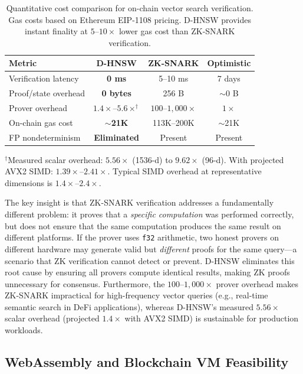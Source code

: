 \documentclass[10pt,journal]{IEEEtran}
\newcommand{\dhnsw}{\textsc{D-HNSW}}
\begin{document}
\begin{table}[t]
  \centering
  \caption{Quantitative cost comparison for on-chain vector search verification. Gas costs based on Ethereum EIP-1108 pricing. D-HNSW provides instant finality at $5$--$10\times$ lower gas cost than ZK-SNARK verification.}
  \label{tab:quant_comparison}
  \footnotesize
  \begin{tabular}{lccc}
    \toprule
    \textbf{Metric} & \textbf{\dhnsw{}} & \textbf{ZK-SNARK} & \textbf{Optimistic} \\
    \midrule
    Verification latency & \textbf{0 ms} & 5--10 ms & 7 days \\
    Proof/state overhead & \textbf{0 bytes} & 256 B & $\sim$0 B \\
    Prover overhead & $1.4\times$--$5.6\times^{\dagger}$ & $100$--$1{,}000\times$ & $1\times$ \\
    On-chain gas cost & \textbf{$\sim$21K} & 113K--200K & $\sim$21K \\
    FP nondeterminism & \textbf{Eliminated} & Present & Present \\
    \bottomrule
  \end{tabular}
  \vspace{1mm}
  {\footnotesize $^{\dagger}$Measured scalar overhead: $5.56\times$ (1536-d) to $9.62\times$ (96-d). With projected AVX2 SIMD: $1.39\times$--$2.41\times$. Typical SIMD overhead at representative dimensions is $1.4\times$--$2.4\times$.}
\end{table}

The key insight is that ZK-SNARK verification addresses a fundamentally different problem: it proves that a \emph{specific computation} was performed correctly, but does not ensure that the same computation produces the same result on different platforms. If the prover uses \texttt{f32} arithmetic, two honest provers on different hardware may generate valid but \emph{different} proofs for the same query---a scenario that ZK verification cannot detect or prevent. \dhnsw{} eliminates this root cause by ensuring all provers compute identical results, making ZK proofs unnecessary for consensus. Furthermore, the $100$--$1{,}000\times$ prover overhead makes ZK-SNARK impractical for high-frequency vector queries (e.g., real-time semantic search in DeFi applications), whereas \dhnsw{}'s measured $5.56\times$ scalar overhead (projected $1.4\times$ with AVX2 SIMD) is sustainable for production workloads.

\subsection{WebAssembly and Blockchain VM Feasibility}
\label{sec:wasm_feasibility}
\end{document}

